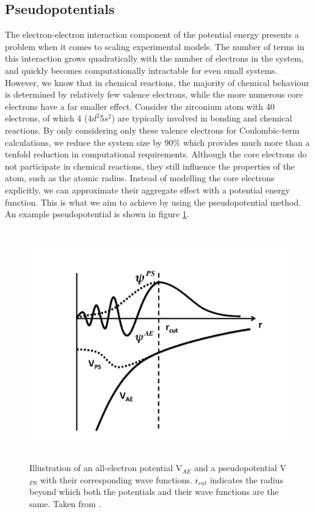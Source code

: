 \subsection{Pseudopotentials}

The electron-electron interaction component of the potential energy presents a problem when it comes to scaling experimental models. The number of terms in this interaction grows quadratically with the number of electrons in the system, and quickly becomes computationally intractable for even small systems. However, we know that in chemical reactions, the majority of chemical behaviour is determined by relatively few valence electrons, while the more numerous core electrons have a far smaller effect. Consider the zirconium atom with 40 electrons, of which 4 (4$d^2$5$s^2$) are typically involved in bonding and chemical reactions. By only considering only these valence electrons for Coulombic-term calculations, we reduce the system size by 90\% which provides much more than a tenfold reduction in computational requirements. Although the core electrons do not participate in chemical reactions, they still influence the properties of the atom, such as the atomic radius. Instead of modelling the core electrons explicitly, we can approximate their aggregate effect with a potential energy function. This is what we aim to achieve by using the pseudopotential method. An example pseudopotential is shown in figure \ref{figure:pseudopotential}.

\begin{figure} %
\label{figure:pseudopotential}
\begin{center}
\includegraphics[height=10cm]{images/pseudopotential.png}
\end{center}
\caption{Illustration of an all-electron potential V$_{AE}$ and a pseudopotential V$_{PS}$ with their corresponding wave functions. r$_{cut}$ indicates the radius beyond which both the potentials and their wave functions are the same. Taken from \cite{Payne1992}.  }
\end{figure}


